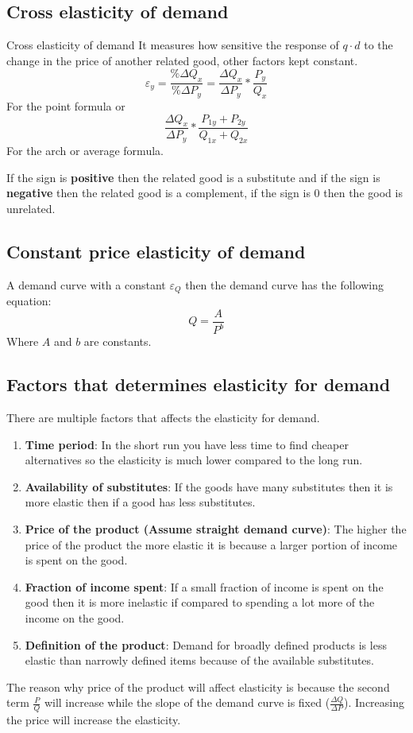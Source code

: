 \documentclass[../ECON-281-Notes.tex]{subfiles}
\begin{document}
\subsection{Cross elasticity of demand}
\begin{DndSidebar}[color=PhbLightGreen]{Cross elasticity of demand}
  It measures how sensitive the response of $q\cdot d$ to the change in the price of another related good, other factors kept constant.
  \[ 
  \varepsilon_{y} = \frac{\%\Delta Q_x}{\%\Delta P_y} = \frac{\Delta Q_x}{\Delta P_y} * \frac{P_y}{Q_x} 
  \]
  For the point formula or 
  \[ 
    \frac{\Delta Q_x}{\Delta P_y} * \frac{P_{1y} + P_{2y}}{Q_{1x} + Q_{2x}} 
  \] 
  For the arch or average formula.
  
  If the sign is \textbf{positive} then the related good is a substitute and if the sign is \textbf{negative} then the related good is a complement, if the sign is $0$ then the good is unrelated.
\end{DndSidebar}

  
\subsection{Constant price elasticity of demand}
A demand curve with a constant $\varepsilon_{Q}$ then the demand curve has the following equation:
\[ 
Q = \frac{A}{P^{b}} 
\] 
Where $A$ and $b$ are constants.

\subsection{Factors that determines elasticity for demand}
There are multiple factors that affects the elasticity for demand.
\begin{enumerate}
  \item \textbf{Time period}: In the short run you have less time to find cheaper alternatives so the elasticity is much lower compared to the long run.
  \item \textbf{Availability of substitutes}: If the goods have many substitutes then it is more elastic then if a good has less substitutes.
  \item \textbf{Price of the product (Assume straight demand curve)}: The higher the price of the product the more elastic it is because a larger portion of income is spent on the good.
  \item \textbf{Fraction of income spent}: If a small fraction of income is spent on the good then it is more inelastic if compared to spending a lot more of the income on the good.
  \item \textbf{Definition of the product}: Demand for broadly defined products is less elastic than narrowly defined items because of the available substitutes. 
\end{enumerate}
\begin{Note}
  The reason why price of the product will affect elasticity is because the second term $\frac{P}{Q}$ will increase while the slope of the demand curve is fixed ($\frac{\Delta Q}{\Delta P}$).
  Increasing the price will increase the elasticity.
\end{Note}
\newpage
\end{document}
